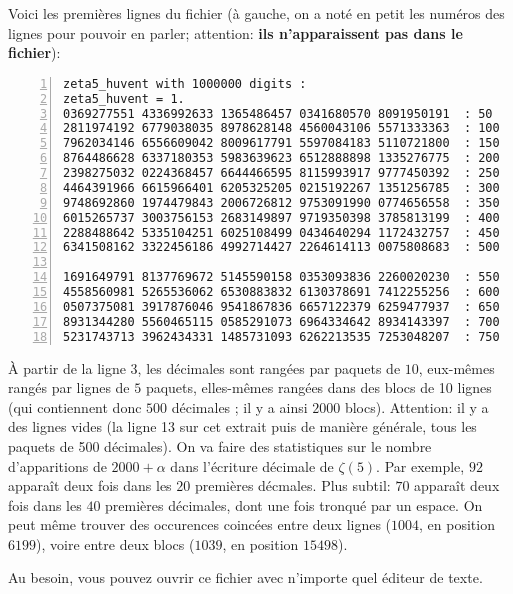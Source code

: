 Voici les premières lignes du fichier (à gauche, on a noté en petit
les numéros des lignes pour pouvoir en parler; attention: \textbf{ils n'apparaissent pas
dans le fichier}):
\begin{Verbatim}[numbers=left]
zeta5_huvent with 1000000 digits : 
zeta5_huvent = 1.
0369277551 4336992633 1365486457 0341680570 8091950191  : 50
2811974192 6779038035 8978628148 4560043106 5571333363  : 100
7962034146 6556609042 8009617791 5597084183 5110721800  : 150
8764486628 6337180353 5983639623 6512888898 1335276775  : 200
2398275032 0224368457 6644466595 8115993917 9777450392  : 250
4464391966 6615966401 6205325205 0215192267 1351256785  : 300
9748692860 1974479843 2006726812 9753091990 0774656558  : 350
6015265737 3003756153 2683149897 9719350398 3785813199  : 400
2288488642 5335104251 6025108499 0434640294 1172432757  : 450
6341508162 3322456186 4992714427 2264614113 0075808683  : 500

1691649791 8137769672 5145590158 0353093836 2260020230  : 550
4558560981 5265536062 6530883832 6130378691 7412255256  : 600
0507375081 3917876046 9541867836 6657122379 6259477937  : 650
8931344280 5560465115 0585291073 6964334642 8934143397  : 700
5231743713 3962434331 1485731093 6262213535 7253048207  : 750
\end{Verbatim}

À partir  de la  ligne 3,  les décimales sont  rangées par  paquets de
$10$, eux-mêmes rangés par lignes  de $5$ paquets, elles-mêmes rangées
dans des blocs de 10 lignes (qui contiennent donc $500$ décimales ; il
y a ainsi $2000$ blocs).  Attention: il y a des lignes vides (la ligne
13 sur cet  extrait puis de manière générale, tous  les paquets de 500
décimales). On va faire des statistiques sur le nombre d’apparitions de
$2000 + \alpha$ dans l’écriture  décimale de $\zeta(5)$.  Par exemple,
$92$ apparaît deux fois dans les $20$ premières décmales. Plus subtil:
$70$ apparaît  deux fois dans  les $40$ premières décimales,  dont une
fois  tronqué par  un  espace.  On peut  même  trouver des  occurences
coincées entre deux lignes ($1004$,  en position $6199$), voire entre
deux blocs ($1039$, en position $15498$).

Au besoin, vous pouvez ouvrir ce fichier avec n'importe quel éditeur
de texte.




